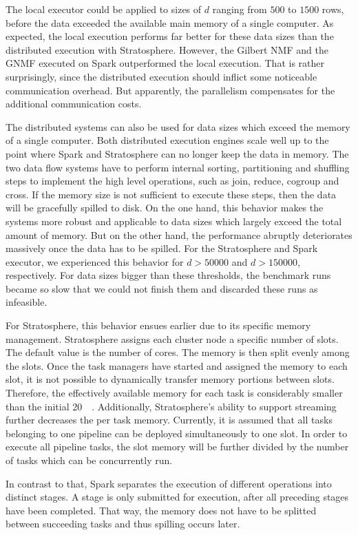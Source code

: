 The local executor could be applied to sizes of $d$ ranging from $500$ to $1500$ rows, before the data exceeded the available main memory of a single computer.
As expected, the local execution performs far better for these data sizes than the distributed execution with Stratosphere.
However, the Gilbert NMF and the GNMF executed on Spark outperformed the local execution.
That is rather surprisingly, since the distributed execution should inflict some noticeable communication overhead.
But apparently, the parallelism compensates for the additional communication costs.

The distributed systems can also be used for data sizes which exceed the memory of a single computer.
Both distributed execution engines scale well up to the point where Spark and Stratosphere can no longer keep the data in memory.
The two data flow systems have to perform internal sorting, partitioning and shuffling steps to implement the high level operations, such as join, reduce, cogroup and cross.
If the memory size is not sufficient to execute these steps, then the data will be gracefully spilled to disk.
On the one hand, this behavior makes the systems more robust and applicable to data sizes which largely exceed the total amount of memory.
But on the other hand, the performance abruptly deteriorates massively once the data has to be spilled.
For the Stratosphere and Spark executor, we experienced this behavior for $d>50000$ and $d>150000$, respectively.
For data sizes bigger than these thresholds, the benchmark runs became so slow that we could not finish them and discarded these runs as infeasible.

For Stratosphere, this behavior ensues earlier due to its specific memory management.
Stratosphere assigns each cluster node a specific number of slots.
The default value is the number of cores.
The memory is then split evenly among the slots.
Once the task managers have started and assigned the memory to each slot, it is not possible to dynamically transfer memory portions between slots.
Therefore, the effectively available memory for each task is considerably smaller than the initial \SI{20}{\giga\byte}.
Additionally, Stratosphere's ability to support streaming further decreases the per task memory.
Currently, it is assumed that all tasks belonging to one pipeline can be deployed simultaneously to one slot.
In order to execute all pipeline tasks, the slot memory will be further divided by the number of tasks which can be concurrently run.

In contrast to that, Spark separates the execution of different operations into distinct stages.
A stage is only submitted for execution, after all preceding stages have been completed.
That way, the memory does not have to be splitted between succeeding tasks and thus spilling occurs later.

